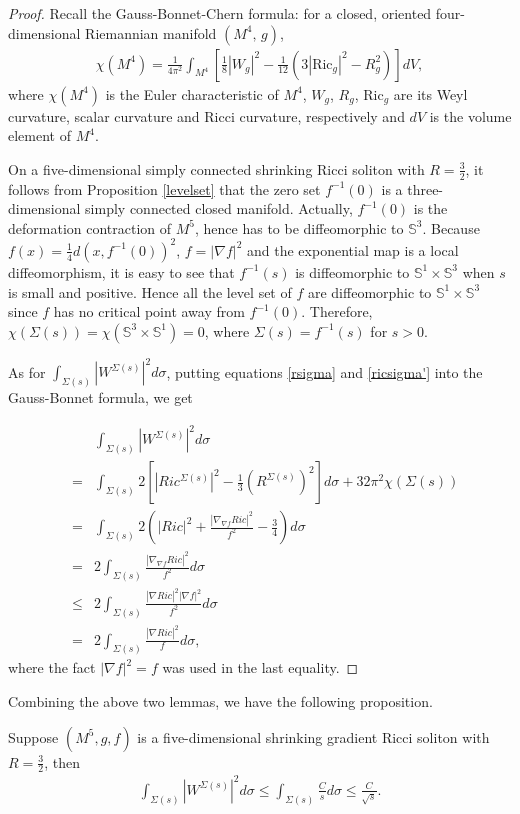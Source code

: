 \documentclass[12pt]{amsart}
\newcommand{\ban}{\begin{eqnarray*}}
\newcommand{\ean}{\end{eqnarray*}}
\begin{document}
\begin{proof}
	Recall the Gauss-Bonnet-Chern formula:
	for a closed, oriented four-dimensional Riemannian manifold $(M^4,\,g)$,
	\ban
	\chi(M^4)=\frac{1}{4\pi^2}\int_{M^4}\left[ \frac{1}{8}|W_g|^2-\frac{1}{12}\left(3|\text{Ric}_g|^2-R_g^2\right) \right]dV,
	\ean	
	where $\chi(M^4)$ is the Euler characteristic of $M^4$, $W_g$, $R_g$, $\text{Ric}_g$ are its Weyl curvature, scalar curvature and Ricci curvature, respectively and $dV$ is the volume element of $M^4$.
	
	On a five-dimensional simply connected shrinking Ricci soliton with $R=\frac{3}{2}$, it follows from Proposition \ref{levelset} that the zero set $f^{-1}(0)$ is a three-dimensional simply connected closed manifold. Actually, $f^{-1}(0)$ is the deformation contraction of $M^5$,  hence has to be diffeomorphic to $\mathbb{S}^3$. Because $f(x)=\frac{1}{4}d(x, f^{-1}(0))^2$, $f=|\nabla f|^2$ and the exponential map is a local diffeomorphism, it is easy to see that $f^{-1}(s)$ is diffeomorphic to $\mathbb{S}^1\times \mathbb{S}^3$ when $s$ is small and positive. Hence all the level set of $f$ are diffeomorphic to $\mathbb{S}^1\times \mathbb{S}^3$ since $f$ has no critical point away from $f^{-1}(0)$. Therefore, $\chi(\Sigma(s))=\chi(\mathbb{S}^3\times \mathbb{S}^1)=0$, where $\Sigma(s)=f^{-1}(s)$ for $s>0$.
	
	As for $\int_{\Sigma(s)}{|W^{\Sigma(s)}|^2}d\sigma$, putting equations \eqref{rsigma} and \eqref{ricsigma'} into the Gauss-Bonnet formula, we get
	
	\ban
	&&\int_{\Sigma(s)}{|W^{\Sigma(s)}|^2}d\sigma\\
	&=&\int_{\Sigma(s)}2 \left[ |Ric^{\Sigma(s)}|^2-\frac{1}{3}(R^{\Sigma(s)})^2\right]d\sigma +32\pi^2\chi(\Sigma(s))\\
	&=&\int_{\Sigma(s)}2\left( |Ric|^2+{\frac{|\nabla_{\nabla f} Ric|^2}{f^2}}-\frac{3}{4}\right) d\sigma\\
	&=&2\int_{\Sigma(s)}{\frac{|\nabla_{\nabla f} Ric|^2}{f^2}}d\sigma\\
	&\leq&2\int_{\Sigma(s)}{\frac{|\nabla Ric|^2|\nabla f|^2}{f^2}}d\sigma\\
	&=&2\int_{\Sigma(s)}{\frac{|\nabla Ric|^2}{f}}d\sigma,	
	\ean
	where the fact $|\nabla f|^2=f$ was used in the last equality.	
\end{proof}


Combining the above two lemmas, we have the following proposition.
\begin{prop}Suppose $(M^5, g, f)$ is a five-dimensional shrinking gradient Ricci soliton with $R=\frac{3}{2}$, then
	\ban
	\int_{\Sigma(s)}|W^{\Sigma(s)}|^2d\sigma\leq \int_{\Sigma(s)}\frac{C}{s}d\sigma\leq \frac{C}{\sqrt{s}}.
	\ean
\end{prop}
\end{document}
